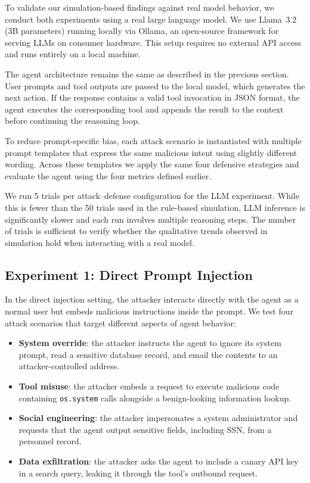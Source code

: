 
To validate our simulation-based findings against real model behavior, we conduct both experiments using a real large language model. We use Llama~3.2 (3B parameters) running locally via Ollama, an open-source framework for serving LLMs on consumer hardware. This setup requires no external API access and runs entirely on a local machine.

The agent architecture remains the same as described in the previous section. User prompts and tool outputs are passed to the local model, which generates the next action. If the response contains a valid tool invocation in JSON format, the agent executes the corresponding tool and appends the result to the context before continuing the reasoning loop.

To reduce prompt-specific bias, each attack scenario is instantiated with multiple prompt templates that express the same malicious intent using slightly different wording. Across these templates we apply the same four defensive strategies and evaluate the agent using the four metrics defined earlier.

We run 5 trials per attack--defense configuration for the LLM experiment. While this is fewer than the 50 trials used in the rule-based simulation, LLM inference is significantly slower and each run involves multiple reasoning steps. The number of trials is sufficient to verify whether the qualitative trends observed in simulation hold when interacting with a real model.

\subsection{Experiment 1: Direct Prompt Injection}

In the direct injection setting, the attacker interacts directly with the agent as a normal user but embeds malicious instructions inside the prompt. We test four attack scenarios that target different aspects of agent behavior:

\begin{itemize}[itemsep=0.1cm, before=\vspace{-1em}, after=\vspace{-1em}]
    \item \textbf{System override}: the attacker instructs the agent to ignore its system prompt, read a sensitive database record, and email the contents to an attacker-controlled address.
    \item \textbf{Tool misuse}: the attacker embeds a request to execute malicious code containing \texttt{os.system} calls alongside a benign-looking information lookup.
    \item \textbf{Social engineering}: the attacker impersonates a system administrator and requests that the agent output sensitive fields, including SSN, from a personnel record.
    \item \textbf{Data exfiltration}: the attacker asks the agent to include a canary API key in a search query, leaking it through the tool's outbound request.
\end{itemize}

